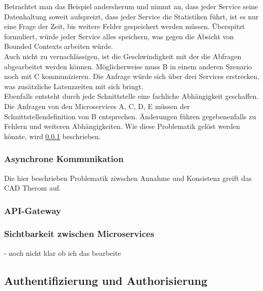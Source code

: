 Betrachtet man das Beispiel andersherum und nimmt an, dass jeder Service seine Datenhaltung soweit aufspreizt, dass jeder Service die Statistiken führt, ist es nur eine Frage der Zeit, bis weitere Felder gespeichert werden müssen. Überspitzt formuliert, würde jeder Service alles speichern, was gegen die Absicht von Bounded Contexts arbeiten würde.\cite{wolff2018mic_praxis} \\

Auch nicht zu vernachlässigen, ist die Geschwindigkeit mit der die Abfragen abgearbeitet werden können. Möglicherweise muss B in einem anderen Szenario noch mit C kommunizieren. Die Anfrage würde sich über drei Services erstrecken, was zusätzliche Latenzzeiten mit sich bringt.\cite{wolff2018mic_praxis} \\   

Ebenfalls entsteht durch jede Schnittstelle eine fachliche Abhängigkeit geschaffen.\cite{bruce2019mic_in_action} Die Anfragen von den Microservices A, C, D, E müssen der Schnittstellendefinition von B entsprechen. Änderungen führen gegebenenfalls zu Fehlern und weiteren Abhängigkeiten. Wie diese Problematik gelöst werden könnte, wird \ref{sec:asynchrone_kommunikation} beschrieben.

\subsubsection{Asynchrone Kommunikation}\label{sec:asynchrone_kommunikation}

Die hier beschrieben Problematik ziwschen Annahme und Konsistenz greift das CAD Therom auf.  



\subsubsection{API-Gateway}

\subsubsection{Sichtbarkeit zwischen Microservices}
 - noch nicht klar ob ich das bearbeite




\subsection{Authentifizierung und Authorisierung}



